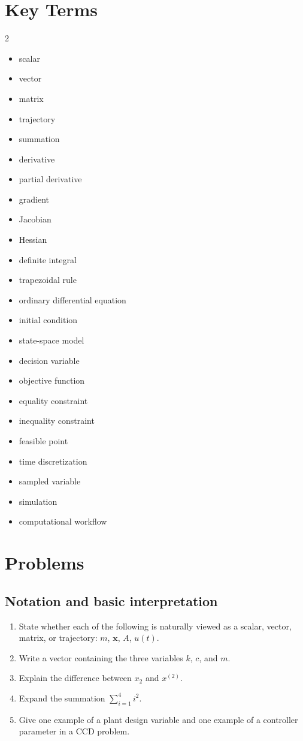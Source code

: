 \documentclass[11pt]{article}
\newcommand{\vect}[1]{\boldsymbol{#1}}
\newcommand{\xstate}{\vect{x}}
\begin{document}
\section{Key Terms}

\begin{multicols}{2}
\begin{itemize}[leftmargin=1.4em,itemsep=0.25em]
  \item scalar
  \item vector
  \item matrix
  \item trajectory
  \item summation
  \item derivative
  \item partial derivative
  \item gradient
  \item Jacobian
  \item Hessian
  \item definite integral
  \item trapezoidal rule
  \item ordinary differential equation
  \item initial condition
  \item state-space model
  \item decision variable
  \item objective function
  \item equality constraint
  \item inequality constraint
  \item feasible point
  \item time discretization
  \item sampled variable
  \item simulation
  \item computational workflow
\end{itemize}
\end{multicols}

\section{Problems}

\subsection*{Notation and basic interpretation}
\begin{enumerate}[leftmargin=1.5em,label=\textbf{P\arabic*.}]
  \item State whether each of the following is naturally viewed as a scalar, vector, matrix, or trajectory: $m$, $\xstate$, $A$, $u(t)$.
  \item Write a vector containing the three variables $k$, $c$, and $m$.
  \item Explain the difference between $x_2$ and $x^{(2)}$.
  \item Expand the summation $\sum_{i=1}^{4} i^2$.
  \item Give one example of a plant design variable and one example of a controller parameter in a CCD problem.
\end{enumerate}
\end{document}
